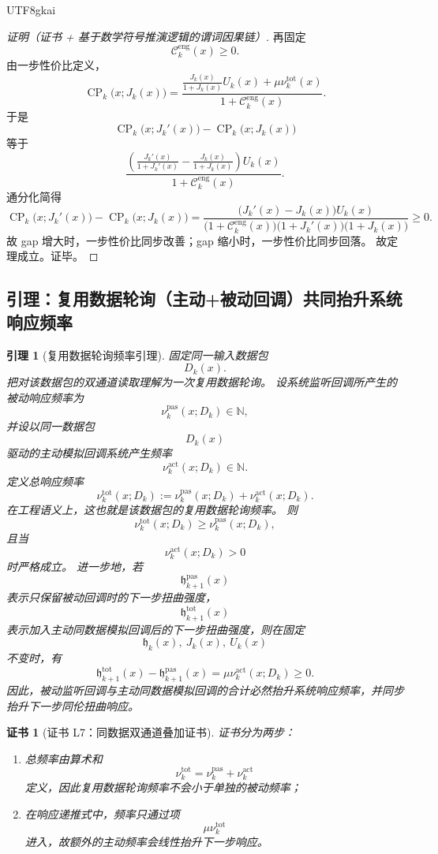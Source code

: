 \documentclass[12pt]{article}
\newtheorem{lemma}{引理}[section]
\newtheorem{Certificate}{证书}[section]
\newcommand{\NN}{\mathbb{N}}
\begin{document}
\begin{CJK*}{UTF8}{gkai}
\begin{proof}[证明（证书 + 基于数学符号推演逻辑的谓词因果链）]
再固定
\[
  \mathcal C_k^{\mathrm{eng}}(x)\ge 0.
\]
由一步性价比定义，
\[
  \operatorname{CP}_k\bigl(x;J_k(x)\bigr)
  =
  \frac{
    \frac{J_k(x)}{1+J_k(x)}U_k(x)+\mu \nu_k^{\mathrm{tot}}(x)
  }{
    1+\mathcal C_k^{\mathrm{eng}}(x)
  }.
\]
于是
\[
  \operatorname{CP}_k\bigl(x;J_k'(x)\bigr)
  -
  \operatorname{CP}_k\bigl(x;J_k(x)\bigr)
\]
等于
\[
  \frac{
    \left(
      \frac{J_k'(x)}{1+J_k'(x)}
      -
      \frac{J_k(x)}{1+J_k(x)}
    \right)U_k(x)
  }{
    1+\mathcal C_k^{\mathrm{eng}}(x)
  }.
\]
通分化简得
\[
  \operatorname{CP}_k\bigl(x;J_k'(x)\bigr)
  -
  \operatorname{CP}_k\bigl(x;J_k(x)\bigr)
  =
  \frac{
    \bigl(J_k'(x)-J_k(x)\bigr)U_k(x)
  }{
    \bigl(1+\mathcal C_k^{\mathrm{eng}}(x)\bigr)\bigl(1+J_k'(x)\bigr)\bigl(1+J_k(x)\bigr)
  }
  \ge 0.
\]
故 gap 增大时，一步性价比同步改善；gap 缩小时，一步性价比同步回落。
故定理成立。证毕。
\end{proof}

\subsection{引理：复用数据轮询（主动+被动回调）共同抬升系统响应频率}
\label{subsec:tex36-callback-frequency}

\begin{lemma}[复用数据轮询频率引理]
\label{lem:tex36-callback-frequency}
固定同一输入数据包
\[
  D_k(x).
\]
把对该数据包的双通道读取理解为一次复用数据轮询。
设系统监听回调所产生的被动响应频率为
\[
  \nu_k^{\mathrm{pas}}(x;D_k)\in\NN,
\]
并设以同一数据包
\[
  D_k(x)
\]
驱动的主动模拟回调系统产生频率
\[
  \nu_k^{\mathrm{act}}(x;D_k)\in\NN.
\]
定义总响应频率
\[
  \nu_k^{\mathrm{tot}}(x;D_k)
  :=
  \nu_k^{\mathrm{pas}}(x;D_k)
  +
  \nu_k^{\mathrm{act}}(x;D_k).
\]
在工程语义上，这也就是该数据包的复用数据轮询频率。
则
\[
  \nu_k^{\mathrm{tot}}(x;D_k)\ge \nu_k^{\mathrm{pas}}(x;D_k),
\]
且当
\[
  \nu_k^{\mathrm{act}}(x;D_k)>0
\]
时严格成立。
进一步地，若
\[
  \mathfrak h_{k+1}^{\mathrm{pas}}(x)
\]
表示只保留被动回调时的下一步扭曲强度，
\[
  \mathfrak h_{k+1}^{\mathrm{tot}}(x)
\]
表示加入主动同数据模拟回调后的下一步扭曲强度，则在固定
\[
  \mathfrak h_k(x),\ J_k(x),\ U_k(x)
\]
不变时，有
\[
  \mathfrak h_{k+1}^{\mathrm{tot}}(x)
  -
  \mathfrak h_{k+1}^{\mathrm{pas}}(x)
  =
  \mu \nu_k^{\mathrm{act}}(x;D_k)
  \ge 0.
\]
因此，被动监听回调与主动同数据模拟回调的合计必然抬升系统响应频率，并同步抬升下一步同伦扭曲响应。
\end{lemma}

\begin{Certificate}[证书 L7：同数据双通道叠加证书]
\label{cert:tex36-l7}
证书分为两步：
\begin{enumerate}
  \item 总频率由算术和
  \[
    \nu_k^{\mathrm{tot}}
    =
    \nu_k^{\mathrm{pas}}+\nu_k^{\mathrm{act}}
  \]
  定义，因此复用数据轮询频率不会小于单独的被动频率；
  \item 在响应递推式中，频率只通过项
  \[
    \mu \nu_k^{\mathrm{tot}}
  \]
  进入，故额外的主动频率会线性抬升下一步响应。
\end{enumerate}
\end{Certificate}


\end{CJK*}
\end{document}
